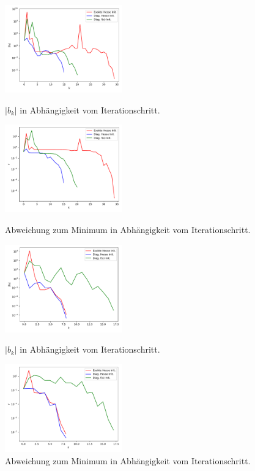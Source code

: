 \begin{figure}
\centering
\includegraphics[width=0.45\textwidth]{A2/build/A2.pdf}
\caption{$|b_k|$ in Abhängigkeit vom Iterationschritt.}
\label{fig:1}
\includegraphics[width=0.45\textwidth]{A2/build/A2r.pdf}
\caption{Abweichung zum Minimum in Abhängigkeit vom Iterationschritt.}
\label{fig:2}
\includegraphics[width=0.45\textwidth]{A2/build/A2_l.pdf}
\caption{$|b_k|$ in Abhängigkeit vom Iterationschritt.}
\label{fig:1}
\includegraphics[width=0.45\textwidth]{A2/build/A2_lr.pdf}
\caption{Abweichung zum Minimum in Abhängigkeit vom Iterationschritt.}
\label{fig:2}
\end{figure}
